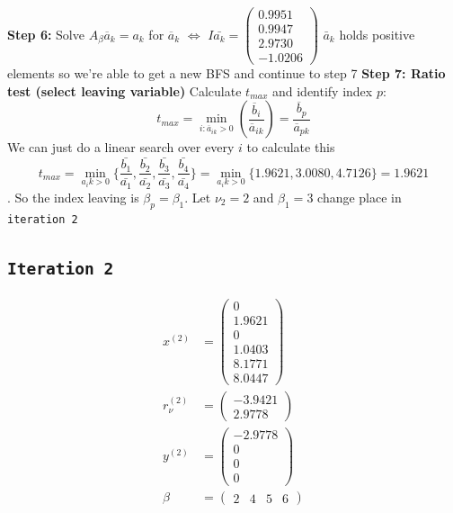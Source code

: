 \documentclass{assignment}
\def\code#1{\texttt{#1}}
\begin{document}
\begin{algorithmic}
    \State \textbf{Step 6: }
    \State Solve $A_{\beta}\overline{a}_k = a_k$ for $\overline{a}_k$ $\Leftrightarrow$ $I\bar{a_k} = \begin{pmatrix}0.9951 \\ 0.9947 \\ 2.9730 \\ -1.0206\end{pmatrix}$ 
    \State $\bar{a}_k$ holds positive elements so we're able to get a new BFS and continue to step 7
    \State \textbf{Step 7: Ratio test (select leaving variable)}
    \State Calculate $t_{max}$ and identify index $p$:
    $$t_{max} = \min_{i: \overline{a}_{ik} > 0} \left( \frac{\overline{b}_i}{\overline{a}_{ik}} \right) = \frac{\overline{b}_p}{\overline{a}_{pk}}$$
    We can just do a linear search over every $i$ to calculate this $$t_{max} = \min_{a_ik>0}\{ \frac{\bar{b_1}}{\bar{a_1}}, \frac{\bar{b_2}}{\bar{a_2}}, \frac{\bar{b_3}}{\bar{a_3}}, \frac{\bar{b_4}}{\bar{a_4}} \} = \min_{a_ik>0} \{ 1.9621, 3.0080, 4.7126\} = 1.9621$$.
    So the index leaving is $\beta_p = \beta_1$.
    \State Let $\nu_2 = 2$ and $\beta_1 = 3$ change place in \code{iteration 2}
\end{algorithmic} 
\subsection*{\code{Iteration 2}}
\begin{align*}
    x^{(2)} &= \begin{pmatrix} 0 \\ 1.9621 \\ 0 \\ 1.0403 \\ 8.1771 \\ 8.0447 \end{pmatrix} \\
    r_{\nu}^{(2)} &= \begin{pmatrix} -3.9421 \\ 2.9778 \end{pmatrix} \\
    y^{(2)} &= \begin{pmatrix} -2.9778 \\ 0 \\ 0 \\ 0 \end{pmatrix} \\
    \beta &= \begin{pmatrix} 2 & 4 & 5 & 6 \end{pmatrix}
\end{align*}
\end{document}
